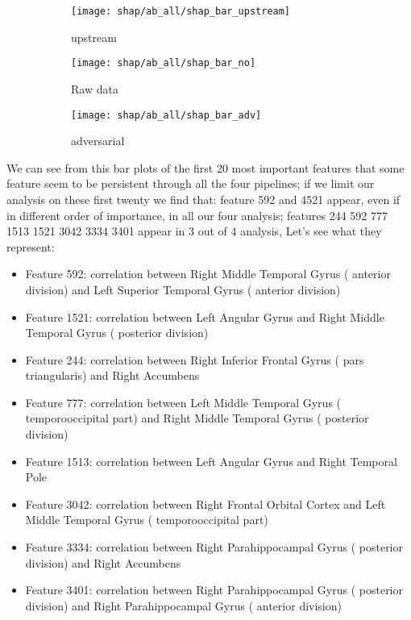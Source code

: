 \documentclass[12pt]{report}
\begin{document}
\begin{figure}
\centering
\begin{subfigure}[b]{.45\textwidth}
   \texttt{[image: shap/ab\_all/shap\_bar\_upstream]}
   \caption{upstream}
   \label{}
\end{subfigure}
\begin{subfigure}[b]{.45\textwidth}
   \texttt{[image: shap/ab\_all/shap\_bar\_no]}
   \caption{Raw data}
   \label{}
\end{subfigure}
\begin{subfigure}[b]{.45\textwidth}
   \texttt{[image: shap/ab\_all/shap\_bar\_adv]}
   \caption{adversarial}
   \label{}
\end{subfigure}
\caption{}
\label{fig:shap_abide_all}
\end{figure}


We can see from this bar plots of the first 20 most important features that some feature seem to be persistent through all the four pipelines; if we limit our analysis on these first twenty we find that: feature 592 and 4521 appear, even if in different order of importance, in all our four analysis; features 244 592 777 1513 1521 3042 3334 3401 appear in 3 out of 4 analysis,
Let's see what they represent:
\begin{itemize}
\item Feature 592: correlation between Right Middle Temporal Gyrus ( anterior division) and Left Superior Temporal Gyrus ( anterior division)
\item Feature 1521: correlation between Left Angular Gyrus  and Right Middle Temporal Gyrus ( posterior division)

\item Feature 244: correlation between Right Inferior Frontal Gyrus ( pars triangularis) and Right Accumbens
\item Feature 777: correlation between Left Middle Temporal Gyrus ( temporooccipital part) and Right Middle Temporal Gyrus ( posterior division)
\item Feature 1513: correlation between Left Angular Gyrus  and Right Temporal Pole
\item Feature 3042: correlation between Right Frontal Orbital Cortex  and Left Middle Temporal Gyrus ( temporooccipital part)
\item Feature 3334: correlation between Right Parahippocampal Gyrus ( posterior division) and Right Accumbens
\item Feature 3401: correlation between Right Parahippocampal Gyrus ( posterior division) and Right Parahippocampal Gyrus ( anterior division)
\end{itemize}
\end{document}
